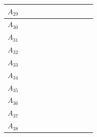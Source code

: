 \documentclass[11pt]{report}
\begin{document}
\begin{table}[h!]
\begin{tabular}{| c | c | c | c | c | c | c | c | c | c | c |}
    \small{$A_{29}$} & \cellcolor{train} & \cellcolor{test}  & \cellcolor{train} & \cellcolor{train} & \cellcolor{train} & \cellcolor{train} & \cellcolor{train} & \cellcolor{train} & \cellcolor{train} &  \cellcolor{train} \\ \hline
    \small{$A_{30}$} & \cellcolor{train} & \cellcolor{train} & \cellcolor{train} & \cellcolor{train} & \cellcolor{test}  & \cellcolor{train} & \cellcolor{train} & \cellcolor{train} & \cellcolor{train} & \cellcolor{test}  \\ \hline
    \small{$A_{31}$} & \cellcolor{train} & \cellcolor{train} & \cellcolor{train} & \cellcolor{train} & \cellcolor{train} & \cellcolor{train} & \cellcolor{test}  & \cellcolor{train} & \cellcolor{test}  &  \cellcolor{train} \\ \hline
    \small{$A_{32}$} & \cellcolor{test}  & \cellcolor{train} & \cellcolor{test}  & \cellcolor{train} & \cellcolor{train} & \cellcolor{train} & \cellcolor{train} & \cellcolor{train} & \cellcolor{train} &  \cellcolor{train} \\ \hline
    \small{$A_{33}$} & \cellcolor{train} & \cellcolor{train} & \cellcolor{train} & \cellcolor{train} & \cellcolor{test}  & \cellcolor{train} & \cellcolor{train} & \cellcolor{train} & \cellcolor{train} &  \cellcolor{train} \\ \hline
    \small{$A_{34}$} & \cellcolor{train} & \cellcolor{train} & \cellcolor{train} & \cellcolor{train} & \cellcolor{test}  & \cellcolor{train} & \cellcolor{train} & \cellcolor{train} & \cellcolor{test}  &  \cellcolor{train} \\ \hline
    \small{$A_{35}$} & \cellcolor{train} & \cellcolor{test}  & \cellcolor{train} & \cellcolor{train} & \cellcolor{train} & \cellcolor{train} & \cellcolor{train} & \cellcolor{train} & \cellcolor{train} &  \cellcolor{train} \\ \hline
    \small{$A_{36}$} & \cellcolor{train} & \cellcolor{train} & \cellcolor{train} & \cellcolor{train} & \cellcolor{train} & \cellcolor{train} & \cellcolor{train} & \cellcolor{train} & \cellcolor{train} &  \cellcolor{train} \\ \hline
    \small{$A_{37}$} & \cellcolor{train} & \cellcolor{train} & \cellcolor{test}  & \cellcolor{train} & \cellcolor{train} & \cellcolor{train} & \cellcolor{train} & \cellcolor{train} & \cellcolor{train} & \cellcolor{test}  \\ \hline
    \small{$A_{38}$} & \cellcolor{train} & \cellcolor{train} & \cellcolor{train} & \cellcolor{train} & \cellcolor{test}  & \cellcolor{train} & \cellcolor{train} & \cellcolor{train} & \cellcolor{train} &  \cellcolor{train} \\ \hline

\end{tabular}
\end{table}
\end{document}
